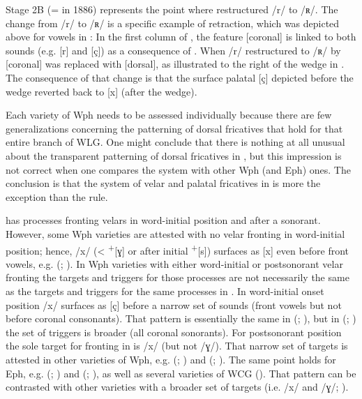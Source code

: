 Stage 2B (= in 1886) represents the point where  restructured /r/ to /ʀ/. The change from /r/ to /ʀ/ is a specific example of retraction, which was depicted above for vowels in : In the first column of , the feature [coronal] is linked to both sounds (e.g. [r] and [ç]) as a consequence of . When /r/ restructured to /ʀ/ by  [coronal] was replaced with [dorsal], as illustrated to the right of the wedge in . The consequence of that change is that the surface palatal [ç] depicted before the wedge reverted back to [x] (after the wedge).

Each variety of Wph needs to be assessed individually because there are few generalizations concerning the patterning of dorsal fricatives that hold for that entire branch of WLG. One might conclude that there is nothing at all unusual about the transparent patterning of dorsal fricatives in , but this impression is not correct when one compares the  system with other Wph (and Eph) ones. The conclusion is that the system of velar and palatal fricatives in  is more the exception than the rule.

 has processes fronting velars in word-initial position and after a sonorant. However, some Wph varieties are attested with no velar fronting in word-initial position; hence, /x/ (< \textsuperscript{+}[ɣ] or after initial \textsuperscript{+}[s]) surfaces as [x] even before front vowels, e.g.  (\citealt{Wix1921}; ). In Wph varieties with either word-initial or postsonorant velar fronting the targets and triggers for those processes are not necessarily the same as the targets and triggers for the same processes in . In word-initial onset position  /x/ surfaces as [ç] before a narrow set of sounds (front vowels but not before coronal consonants). That pattern is essentially the same in  (\citealt{Niebaum1974,Niebaum1982}; ), but in  (\citealt{Arens1908}; ) the set of triggers is broader (all coronal sonorants). For postsonorant position the sole target for fronting in  is /x/ (but not /ɣ/). That narrow set of targets is attested in other varieties of Wph, e.g.  (\citealt{Collitz1899}; ) and  (\citealt{Niebaum1974, Niebaum1982}; ). The same point holds for Eph, e.g.  (\citealt{Bierwirth1890}; ) and  (\citealt{Heibey1891}; ), as well as several varieties of WCG (). That pattern can be contrasted with other varieties with a broader set of targets (i.e. /x/ and /ɣ/; ). 

